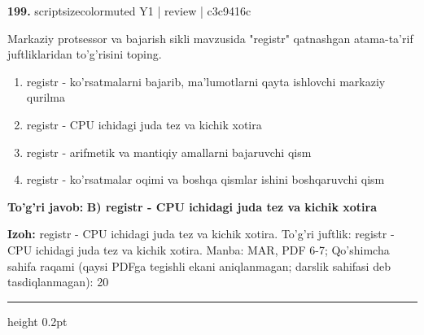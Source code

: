 \documentclass[10pt,a4paper]{article}
\begin{document}
{\bfseries\sffamily\color{ink} 199.} {scriptsizecolor{muted} Y1 | review | c3c9416c}
\par
Markaziy protsessor va bajarish sikli mavzusida "registr" qatnashgan atama-ta'rif juftliklaridan to'g'risini toping.
\begin{enumerate}[label=\Alph*),leftmargin=9mm]
\item registr - ko'rsatmalarni bajarib, ma'lumotlarni qayta ishlovchi markaziy qurilma
\item registr - CPU ichidagi juda tez va kichik xotira
\item registr - arifmetik va mantiqiy amallarni bajaruvchi qism
\item registr - ko'rsatmalar oqimi va boshqa qismlar ishini boshqaruvchi qism
\end{enumerate}
\begin{tcolorbox}[enhanced,breakable,colback=teal!4,colframe=teal!60!black,boxrule=0.45pt,arc=1.2mm,left=2.7mm,right=2.7mm,top=1.8mm,bottom=1.8mm,before skip=2mm,after skip=2mm]
{\bfseries\sffamily\color{teal}To'g'ri javob:} \textbf{B) registr - CPU ichidagi juda tez va kichik xotira}
\par\smallskip
{\bfseries Izoh:} registr - CPU ichidagi juda tez va kichik xotira. To'g'ri juftlik: registr - CPU ichidagi juda tez va kichik xotira. Manba: MAR, PDF 6-7; Qo'shimcha sahifa raqami (qaysi PDFga tegishli ekani aniqlanmagan; darslik sahifasi deb tasdiqlanmagan): 20
\end{tcolorbox}
\vspace{2mm}\hrule height 0.2pt\vspace{3mm}
\end{document}
